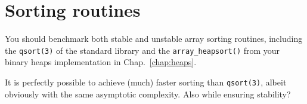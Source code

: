 \chapter{Sorting routines}\label{chap:benchmark:sorting}

You should benchmark both stable and unstable array sorting routines, including the \texttt{qsort(3)} of the standard library and the \texttt{array\_heapsort()} from your binary heaps implementation in Chap.~\ref{chap:heaps}. 

It is perfectly possible to achieve (much) faster sorting than \texttt{qsort(3)}, albeit obviously with the same asymptotic complexity. Also while ensuring stability?

